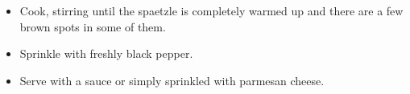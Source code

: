 \documentclass [11pt, letterpaper] {article}
\newcommand \fileName {Spaetzle}
\begin{document}
\begin{description}
\begin{description}
\begin{itemize}
			\item Cook, stirring until the spaetzle is completely warmed up and there are a few brown spots in some of them.
			\item Sprinkle with freshly black pepper.
			\item Serve with a sauce or simply sprinkled with parmesan cheese.
		\end{itemize}
	\end{description}
\end{description}


\end{document}
